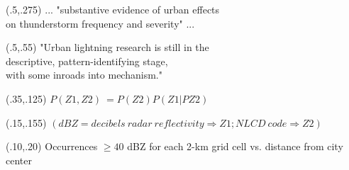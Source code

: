 \documentclass[
paper=128mm:96mm, %
fontsize=11pt, %
pagesize, %
parskip=half-, %
]{scrartcl}
\theoremstyle{mythmstyle} %
\begin{document}
 
 \begin{textblock}{1}(.5,.275)
  \small {... "substantive evidence of urban effects \\ 
  on thunderstorm frequency and severity" ...}
\end{textblock}

 \begin{textblock}{1}(.5,.55)
  \small {"Urban lightning research is still in the \\ 
  descriptive, pattern-identifying stage, \\
  with some inroads into mechanism."}
\end{textblock}

 \clearpage



 

\begin{textblock}{1}(.35,.125)
  \footnotesize {$P(Z1, Z2) \ = P(Z2)P(Z1|PZ2)$}
\end{textblock}

\begin{textblock}{1}(.15,.155)
  \footnotesize {$(dBZ = decibels \ radar \ reflectivity \Rightarrow  Z1; NLCD \ code \Rightarrow Z2)$}
\end{textblock}


\begin{textblock}{1}(.10,.20)
  \footnotesize{Occurrences $\geq 40$ dBZ for each 2-km grid cell vs. distance from city center}
\end{textblock}
 
\end{document}
